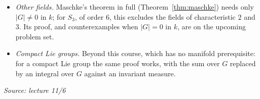 \documentclass[11pt]{report}
\newcommand{\srcline}[1]{\par\hfill{\footnotesize\textit{Source: #1}}}
\begin{document}
\begin{rembox}\label{rem:beyond-r-finite-groups}
\begin{itemize}[nosep]
    \item \emph{Other fields.} Maschke's theorem in full (Theorem~\ref{thm:maschke}) needs only $|G| \neq 0$ in $k$; for $S_3$, of order $6$, this excludes the fields of characteristic $2$ and $3$. Its proof, and counterexamples when $|G| = 0$ in $k$, are on the upcoming problem set.
    \item \emph{Compact Lie groups.} Beyond this course, which has no manifold prerequisite: for a compact Lie group the same proof works, with the sum over $G$ replaced by an integral over $G$ against an invariant measure.
\end{itemize}
\srcline{lecture 11/6}
\end{rembox}
\end{document}
